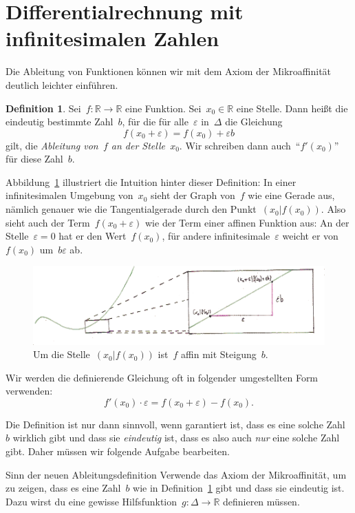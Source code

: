 \documentclass{zirkelblatt}
\newcommand{\RR}{\mathbb{R}}
\theoremstyle{definition}
\newtheorem{defn}{Definition}[section]
\theoremstyle{plain}
\theoremstyle{remark}
\begin{document}
\section{Differentialrechnung mit infinitesimalen Zahlen}

Die Ableitung von Funktionen können wir mit dem Axiom der Mikroaffinität
deutlich leichter einführen.

\begin{defn}\label{defn:sdg-ableitung}
Sei~$f : \RR \to \RR$ eine Funktion. Sei~$x_0 \in \RR$ eine Stelle.
Dann heißt die eindeutig bestimmte Zahl~$b$, für die für alle~$\varepsilon$
in~$\Delta$ die Gleichung
\[ f(x_0 + \varepsilon) = f(x_0) + \varepsilon b \]
gilt, die \emph{Ableitung von~$f$ an der Stelle~$x_0$}. Wir schreiben dann
auch~"`$f'(x_0)$"' für diese Zahl~$b$.\end{defn}

Abbildung~\ref{fig:ableitung-sdg} illustriert die Intuition hinter dieser
Definition: In einer infinitesimalen Umgebung von~$x_0$ sieht der Graph von~$f$
wie eine Gerade aus, nämlich genauer wie die Tangentialgerade durch den
Punkt~$(x_0|f(x_0))$. Also sieht auch der Term~$f(x_0 + \varepsilon)$ wie der
Term einer affinen Funktion aus: An der Stelle~$\varepsilon = 0$ hat er den
Wert~$f(x_0)$, für andere infinitesimale~$\varepsilon$ weicht er von~$f(x_0)$
um~$b \varepsilon$ ab.

\begin{figure}[b]
  \centering
  \includegraphics{sdg-ableitung}
  \caption{\label{fig:ableitung-sdg}Um die Stelle~$(x_0|f(x_0))$ ist~$f$ affin
  mit Steigung~$b$.}
\end{figure}

Wir werden die definierende Gleichung oft in folgender umgestellten Form
verwenden:
\[ f'(x_0) \cdot \varepsilon = f(x_0 + \varepsilon) - f(x_0). \]

Die Definition ist nur dann sinnvoll, wenn garantiert ist, dass es eine
solche Zahl~$b$ wirklich gibt und dass sie \emph{eindeutig} ist, dass es also
auch \emph{nur} eine solche Zahl gibt. Daher müssen wir folgende Aufgabe
bearbeiten.

\begin{aufgabeShaded}{Sinn der neuen Ableitungsdefinition}
Verwende das Axiom der Mikroaffinität, um zu zeigen, dass es eine Zahl~$b$ wie in
Definition~\ref{defn:sdg-ableitung} gibt und dass sie eindeutig ist. Dazu wirst
du eine gewisse Hilfsfunktion~$g : \Delta \to \RR$ definieren müssen.
\end{aufgabeShaded}
\end{document}
